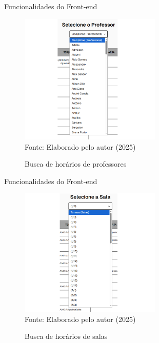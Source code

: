\begin{frame}{Funcionalidades do Front-end}
    \begin{figure}
        \centering
        \vspace{-0.5cm}
        \caption{Busca de horários de professores}
        \vspace{-0.2cm}
        \includegraphics[width=0.6\textwidth]{figuras/front-18.png}
        \\ %
        \small Fonte: Elaborado pelo autor (2025)
    \end{figure}
\end{frame}

\begin{frame}{Funcionalidades do Front-end}
    \begin{figure}
        \centering
        \vspace{-0.5cm}
        \caption{Busca de horários de salas}
        \vspace{-0.2cm}
        \includegraphics[width=0.6\textwidth]{figuras/front-19.png}
        \\ %
        \small Fonte: Elaborado pelo autor (2025)
    \end{figure}
\end{frame}

